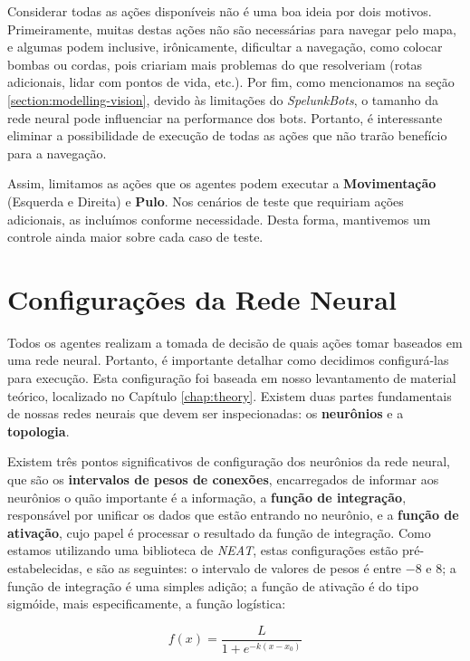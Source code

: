 Considerar todas as ações disponíveis não é uma boa ideia por dois motivos.
Primeiramente, muitas destas ações não são necessárias para navegar pelo mapa, e
algumas podem inclusive, irônicamente, dificultar a navegação, como colocar
bombas ou cordas, pois criariam mais problemas do que resolveriam (rotas
adicionais, lidar com pontos de vida, etc.). Por fim, como mencionamos na seção
\ref{section:modelling-vision}, devido às limitações do \textit{SpelunkBots}, o
tamanho da rede neural pode influenciar na performance dos bots. Portanto, é
interessante eliminar a possibilidade de execução de todas as ações que não
trarão benefício para a navegação.

Assim, limitamos as ações que os agentes podem executar a \textbf{Movimentação}
(Esquerda e Direita) e \textbf{Pulo}. Nos cenários de teste que requiriam ações
adicionais, as incluímos conforme necessidade. Desta forma, mantivemos um
controle ainda maior sobre cada caso de teste.

\section{\label{section:modelling-network}Configurações da Rede Neural}
Todos os agentes realizam a tomada de decisão de quais ações tomar baseados em
uma rede neural. Portanto, é importante detalhar como decidimos configurá-las
para execução. Esta configuração foi baseada em nosso levantamento de material
teórico, localizado no Capítulo \ref{chap:theory}. Existem duas partes
fundamentais de nossas redes neurais que devem ser inspecionadas: os
\textbf{neurônios} e a \textbf{topologia}.

Existem três pontos significativos de configuração dos neurônios da rede neural,
que são os \textbf{intervalos de pesos de conexões}, encarregados de informar
aos neurônios o quão importante é a informação, a \textbf{função de integração},
responsável por unificar os dados que estão entrando no neurônio, e a
\textbf{função de ativação}, cujo papel é processar o resultado da função de
integração. Como estamos utilizando uma biblioteca de \textit{NEAT}, estas
configurações estão pré-estabelecidas, e são as seguintes: o intervalo de
valores de pesos é entre $-8$ e $8$; a função de integração é uma simples
adição; a função de ativação é do tipo sigmóide, mais especificamente, a função
logística:

\begin{equation}
	\label{eq:neat-activation}
	f(x) = \frac{L}{1+e^{-k(x-x_{0})}}
\end{equation}

